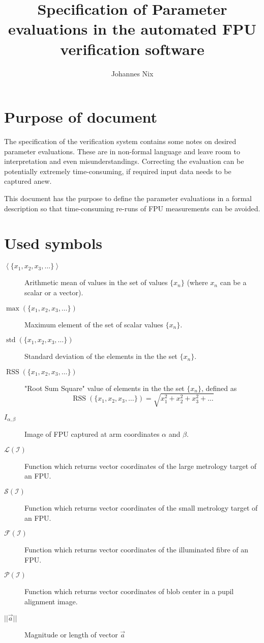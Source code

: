 \documentclass[11pt,a4paper,twoside]{scrartcl}
\DeclareMathOperator{\std}{std}
\DeclareMathOperator{\RSS}{RSS}
\begin{document}
\title{Specification of Parameter evaluations in the automated FPU verification software}

\author{Johannes Nix}

\maketitle
\tableofcontents

\cleardoublepage
\section{Purpose of document}

The specification of the verification system contains some notes on
desired parameter evaluations. These are in non-formal language and
leave room to interpretation and even misunderstandings.  Correcting
the evaluation can be potentially extremely time-consuming, if
required input data needs to be captured anew.

This document has the purpose to define the parameter evaluations in a
formal description so that time-consuming re-runs of FPU measurements
can be avoided.

\section{Used symbols}
\begin{description}
\item[$ \left< \{ x_1, x_2, x_3, \ldots \} \right> $] Arithmetic
  mean of values in the set of values $\{ x_n \} $ (where
  $x_n$ can be a scalar or a vector).
\item[$\max(\{x_1, x_2, x_3, \ldots \})$] Maximum element of
  the set of scalar values $\{ x_n \}$.
\item[$\std(\{x_1, x_2, x_3, \ldots \})$] Standard deviation of the
  elements in the the set $\{ x_n \}$.
\item[$\RSS(\{x_1, x_2, x_3, \ldots \})$] "Root Sum Square" value of
  elements in the the set $\{ x_n \}$, defined as
  \[
  \RSS(\{x_1, x_2, x_3, \ldots\}) = \sqrt{x_1^2 + x_2^2 + x_3^2 + \ldots}
  \]

\item[$I_{\alpha,\beta}$] Image of FPU captured at arm coordinates
  $\alpha$ and $\beta$.
\item[$\mathcal{L(I)}$] Function which returns vector coordinates of
  the large metrology target of an FPU.
\item[$\mathcal{S(I)}$] Function which returns vector coordinates of
  the small metrology target of an FPU.
\item[$\mathcal{F(I)}$] Function which returns vector coordinates of
  the illuminated fibre of an FPU.
\item[$\mathcal{P(I)}$] Function which returns vector coordinates of
  blob center in a pupil alignment image.
  \item[$||\vec{a}||$] Magnitude or length of vector $\vec{a}$
\end{description}
\end{document}
